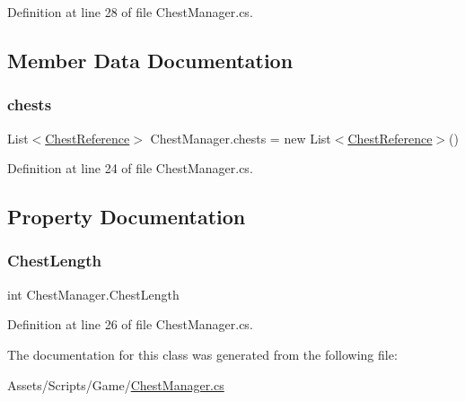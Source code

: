 Definition at line 28 of file Chest\+Manager.\+cs.



\subsection{Member Data Documentation}
\mbox{\label{class_chest_manager_a6276ab915d10fdc1d93d715718a72aa4}} 
\subsubsection{\texorpdfstring{chests}{chests}}
{\footnotesize\ttfamily List$<$\mbox{\hyperlink{class_chest_reference}{Chest\+Reference}}$>$ Chest\+Manager.\+chests = new List$<$\mbox{\hyperlink{class_chest_reference}{Chest\+Reference}}$>$()}



Definition at line 24 of file Chest\+Manager.\+cs.



\subsection{Property Documentation}
\mbox{\label{class_chest_manager_a44c56882941073c68002b3f6ae02ffec}} 
\subsubsection{\texorpdfstring{Chest\+Length}{ChestLength}}
{\footnotesize\ttfamily int Chest\+Manager.\+Chest\+Length\hspace{0.3cm}{\ttfamily [get]}}



Definition at line 26 of file Chest\+Manager.\+cs.



The documentation for this class was generated from the following file\+:\begin{DoxyCompactItemize}
\item 
Assets/\+Scripts/\+Game/\mbox{\hyperlink{_chest_manager_8cs}{Chest\+Manager.\+cs}}\end{DoxyCompactItemize}
